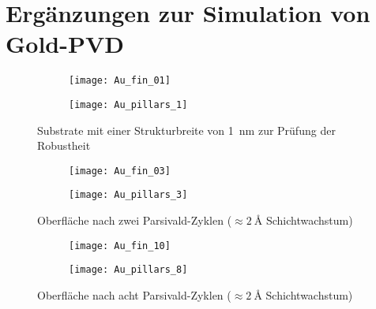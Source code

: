 \chapter{Ergänzungen zur Simulation von Gold-PVD}

\begin{figure}[!h]
  \captionsetup[subfigure]{singlelinecheck=false}
  \def\subfigwidth{0.49\textwidth}

  \begin{subfigure}[t]{\subfigwidth}
    \texttt{[image: Au\_fin\_01]}
    \label{fig:goldnanostructures-fins}
  \end{subfigure}
  \hfill
  \begin{subfigure}[t]{\subfigwidth}
    \texttt{[image: Au\_pillars\_1]}
    \label{fig:goldnanostructures-columns}
  \end{subfigure}

  \caption{Substrate mit einer Strukturbreite von \SI{1}{\nano\meter} zur Prüfung der Robustheit}
  \label{fig:goldnanostructures}

\end{figure}

\begin{figure}[!h]
  \captionsetup[subfigure]{singlelinecheck=false}
  \def\subfigwidth{0.49\textwidth}

  \begin{subfigure}[t]{\subfigwidth}
    \texttt{[image: Au\_fin\_03]}
    \label{fig:goldnanostructures-fins-step3}
  \end{subfigure}
  \hfill
  \begin{subfigure}[t]{\subfigwidth}
    \texttt{[image: Au\_pillars\_3]}
    \label{fig:goldnanostructures-columns-step3}
  \end{subfigure}

  \caption{Oberfläche nach zwei Parsivald-Zyklen ($\approx \SI{2}{\angstrom}$ Schichtwachstum)}
  \label{fig:goldnanostructures-step3}

\end{figure}

\begin{figure}[!h]
  \captionsetup[subfigure]{singlelinecheck=false}
  \def\subfigwidth{0.49\textwidth}

  \begin{subfigure}[t]{\subfigwidth}
    \texttt{[image: Au\_fin\_10]}
    \label{fig:goldnanostructures-fins-step10}
  \end{subfigure}
  \hfill
  \begin{subfigure}[t]{\subfigwidth}
    \texttt{[image: Au\_pillars\_8]}
    \label{fig:goldnanostructures-columns-step8}
  \end{subfigure}

  \caption{Oberfläche nach acht Parsivald-Zyklen ($\approx \SI{2}{\angstrom}$ Schichtwachstum)}
  \label{fig:goldnanostructures-step9}

\end{figure}
